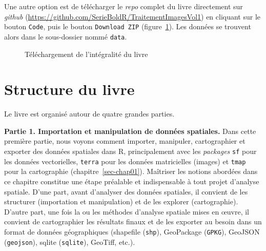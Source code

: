 \documentclass[
  letterpaper,
  DIV=11,
  numbers=noendperiod]{scrreprt}
\begin{document}
Une autre option est de télécharger le \emph{repo} complet du livre
directement sur \emph{github}
(\url{https://github.com/SerieBoldR/TraitementImagesVol1}) en cliquant
sur le bouton \texttt{Code}, puis le bouton \texttt{Download\ ZIP}
(figure~\ref{fig-downloaffromgit}). Les données se trouvent alors dans
le sous-dossier nommé \texttt{data}.

\begin{figure}


\caption{\label{fig-downloaffromgit}Téléchargement de l'intégralité du
livre}

\end{figure}%

\section*{Structure du livre}\label{sect004}


Le livre est organisé autour de quatre grandes parties.

\textbf{Partie 1. Importation et manipulation de données spatiales.}
Dans cette première partie, nous voyons comment importer, manipuler,
cartographier et exporter des données spatiales dans R, principalement
avec les \emph{packages} \texttt{sf} pour les données vectorielles,
\texttt{terra} pour les données matricielles (images) et \texttt{tmap}
pour la cartographie (chapitre~\ref{sec-chap01}). Maîtriser les notions
abordées dans ce chapitre constitue une étape préalable et indispensable
à tout projet d'analyse spatiale. D'une part, avant d'analyser des
données spatiales, il convient de les structurer (importation et
manipulation) et de les explorer (cartographie). D'autre part, une fois
la ou les méthodes d'analyse spatiale mises en œuvre, il convient de
cartographier les résultats finaux et de les exporter au besoin dans un
format de données géographiques (shapefile (\texttt{shp}), GeoPackage
(\texttt{GPKG}), GeoJSON (\texttt{geojson}), sqlite (\texttt{sqlite}),
GeoTiff, etc.).
\end{document}
